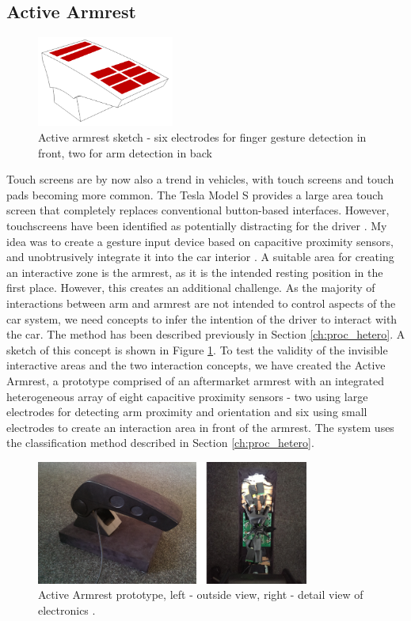 \subsection{Active Armrest}
\label{ch:prot_armrest}
\begin{figure}[ht]
\centering
\includegraphics[width=0.4\textwidth]{images/active_armrest}
\caption{Active armrest sketch - six electrodes for finger gesture detection in front, two for arm detection in back}
\label{fig:armrest_sketch}
\end{figure}

Touch screens are by now also a trend in vehicles, with touch screens and touch pads becoming more common. The Tesla Model S provides a large area touch screen that completely replaces conventional button-based interfaces.  However, touchscreens have been identified as potentially distracting for the driver \cite{rumelin2013make}. My idea was to create a gesture input device based on capacitive proximity sensors, and unobtrusively integrate it into the car interior \cite{braun2013ActiveArmrest}. A suitable area for creating an interactive zone is the armrest, as it is the intended resting position in the first place. However, this creates an additional challenge. As the majority of interactions between arm and armrest are not intended to control aspects of the car system, we need concepts to infer the intention of the driver to interact with the car. The method has been described previously in Section \ref{ch:proc_hetero}. A sketch of this concept is shown in Figure \ref{fig:armrest_sketch}. To test the validity of the invisible interactive areas and the two interaction concepts, we have created the Active Armrest, a prototype comprised of an aftermarket armrest with an integrated heterogeneous array of eight capacitive proximity sensors - two using large electrodes for detecting arm proximity and orientation and six using small electrodes to create an interaction area in front of the armrest. The system uses the classification method described in Section \ref{ch:proc_hetero}.

\begin{figure}[ht]
\centering
\includegraphics[width=0.8\textwidth]{images/armrest_proto}
\caption{Active Armrest prototype, left - outside view, right - detail view of electronics \cite{braun2013ActiveArmrest}.}
\label{fig:armrest_proto}
\end{figure}

